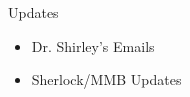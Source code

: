 \begin{frame}{Updates}
    \begin{itemize}
        \item Dr. Shirley's Emails
        \item Sherlock/MMB Updates
    \end{itemize}
\end{frame}

